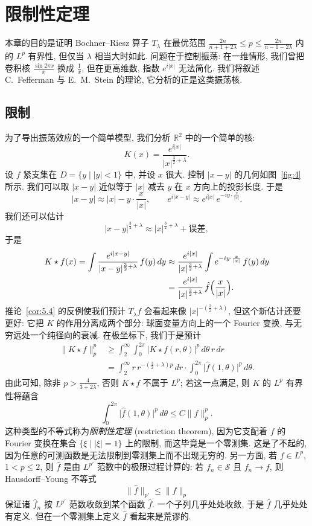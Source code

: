 \chapter{限制性定理}
\label{chap:6}

本章的目的是证明 Bochner--Riesz 算子 $T_\lambda$ 在最优范围 $\frac{2n}{n+1+2\lambda}\leq p\leq\frac{2n}{n-1-2\lambda}$ 内的 $L^p$ 有界性, 但仅当 $\lambda$ 相当大时如此. 问题在于控制振荡: 在一维情形, 我们曾把卷积核 $\frac{\sin 2\pi x}{x}$ 换成 $\frac{1}{x}$, 但在更高维数, 指数 $e^{i|x|}$ 无法简化. 我们将叙述 C.~Fefferman 与 E.~M.~Stein 的理论, 它分析的正是这类振荡核.

\section{限制}
\label{sec:6.1}

为了导出振荡效应的一个简单模型, 我们分析 $\mathbb{R}^{2}$ 中的一个简单的核:
\[
K(x)=\frac{e^{i|x|}}{|x|^{\frac{3}{2}+\lambda}}.
\]
设 $f$ 紧支集在 $D=\{y \mid |y|<1\}$ 中, 并设 $x$ 很大. 控制 $|x-y|$ 的几何如图~\ref{fig:4} 所示. 我们可以取 $|x-y|$ 近似等于 $|x|$ 减去 $y$ 在 $x$ 方向上的投影长度. 于是
\[
|x-y|\approx|x|-y\cdot\frac{x}{|x|},
\qquad
e^{i|x-y|}\approx e^{i|x|}\,e^{-iy\cdot\frac{x}{|x|}}.
\]
我们还可以估计
\[
|x-y|^{\frac{3}{2}+\lambda}\approx|x|^{\frac{3}{2}+\lambda}+\text{误差},
\]
于是
\begin{align*}
K\star f(x)=\int\frac{e^{i|x-y|}}{|x-y|^{\frac{3}{2}+\lambda}}\,f(y)\,dy
&\approx\frac{e^{i|x|}}{|x|^{\frac{3}{2}+\lambda}}\int e^{-iy\cdot\frac{x}{|x|}}\,f(y)\,dy \\
&=\frac{e^{i|x|}}{|x|^{\frac{3}{2}+\lambda}}\,\hat{f}\Bigl(\frac{x}{|x|}\Bigr).
\end{align*}
推论~\ref{cor:5.4} 的反例使我们预计 $T_{\lambda}f$ 会看起来像 $|x|^{-(\frac{3}{2}+\lambda)}$, 但这个新估计还要更好: 它把 $K$ 的作用分离成两个部分: 球面变量方向上的一个 Fourier 变换, 与无穷远处一个纯径向的衰减. 在极坐标下, 我们于是预计
\begin{align*}
\|K\star f\|_{p}^{p}&\geq\int_{2}^{\infty}\int_{0}^{2\pi}|K\star f(r,\theta)|^{p}\,d\theta\,r\,dr \\
&=\int_{2}^{\infty}r\,r^{-(\frac{3}{2}+\lambda)p}\,dr\cdot\int_{0}^{2\pi}\bigl|\hat{f}(1,\theta)\bigr|^{p}\,d\theta.
\end{align*}
由此可知, 除非 $p>\frac{4}{3+2\lambda}$, 否则 $K\star f$ 不属于 $L^p$; 若这一点满足, 则 $K$ 的 $L^p$ 有界性将蕴含
\[
\int_{0}^{2\pi}\bigl|\hat{f}(1,\theta)\bigr|^{p}\,d\theta\leq C\|f\|_{p}^{p}.
\]
这种类型的不等式称为\emph{限制性定理} (restriction theorem), 因为它支配着 $f$ 的 Fourier 变换在集合 $\{\xi \mid |\xi|=1\}$ 上的限制, 而这毕竟是一个零测集. 这是了不起的, 因为任意的可测函数是无法限制到零测集上而不出现无穷的. 另一方面, 若 $f\in L^p$, $1<p\leq 2$, 则 $\hat{f}$ 是由 $L^{p'}$ 范数中的极限过程计算的: 若 $f_n\in\mathcal{S}$ 且 $f_n\to f$, 则 Hausdorff--Young 不等式
\[
\|\hat{f}\|_{p'}\leq\|f\|_{p}
\]
保证诸 $\hat{f}_n$ 按 $L^{p'}$ 范数收敛到某个函数 $\hat{f}$. 一个子列几乎处处收敛, 于是 $\hat{f}$ 几乎处处有定义. 但在一个零测集上定义 $\hat{f}$ 看起来是荒谬的.

